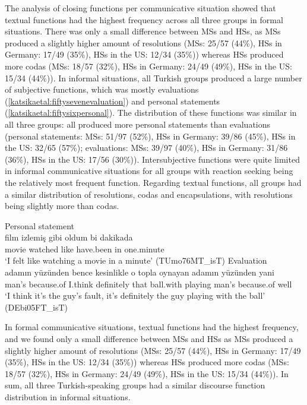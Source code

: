 \documentclass[output=paper,colorlinks,citecolor=brown]{langscibook}
\begin{document}
The analysis of closing functions per communicative situation showed that textual functions had the highest frequency across all three groups in formal situations. There was only a small difference between MSs and HSs, as MSs produced a slightly higher amount of resolutions (MSs: 25/57 (44\%), HSs in Germany: 17/49 (35\%), HSs in the US: 12/34 (35\%)) whereas HSs produced more codas (MSs: 18/57 (32\%), HSs in Germany: 24/49 (49\%), HSs in the US: 15/34 (44\%)). In informal situations, all Turkish groups produced a large number of subjective functions, which was mostly evaluations (\ref{katsikaetal:fiftysevenevaluation}) and personal statements (\ref{katsikaetal:fiftysixpersonal}). The distribution of these functions was similar in all three groups: all produced more personal statements than evaluations (personal statements: MSs: 51/97 (52\%), HSs in Germany: 39/86 (45\%), HSs in the US: 32/65 (57\%); evaluations: MSs: 39/97 (40\%), HSs in Germany: 31/86 (36\%), HSs in the US: 17/56 (30\%)). Intersubjective functions were quite limited in informal communicative situations for all groups with reaction seeking being the relatively most frequent function. Regarding textual functions, all groups had a similar distribution of resolutions, codas and encapsulations, with resolutions being slightly more than codas.  

\ea Personal statement\\ \label{katsikaetal:fiftysixpersonal}
\gll film izlemiş gibi oldum bi dakikada\\
     movie watched like have.been in one.minute\\
\glt ‘I felt like watching a movie in a minute' (TUmo76MT\_isT)
\ex Evaluation\\ \label{katsikaetal:fiftysevenevaluation}
\gll adamın yüzünden bence kesinlikle o topla oynayan adamın yüzünden yani\\
     man's because.of I.think definitely that ball.with  playing man's because.of well\\
\glt ‘I think it's the guy's fault, it's definitely the guy playing with the ball' (DEbi05FT\_isT)
\z

In formal communicative situations, textual functions had the highest frequency, and we found only a small difference between MSs and HSs as MSs produced a slightly higher amount of resolutions (MSs: 25/57 (44\%), HSs in Germany: 17/49 (35\%), HSs in the US: 12/34 (35\%)) whereas HSs produced more codas (MSs: 18/57 (32\%), HSs in Germany: 24/49 (49\%), HSs in the US: 15/34 (44\%)). In sum, all three Turkish-speaking groups had a similar discourse function distribution in informal situations.
\end{document}
